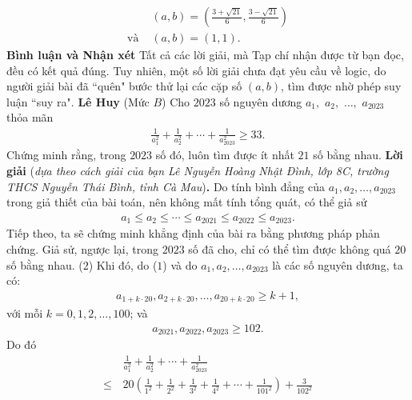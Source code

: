 \begin{multicols}{2}
\begin{align*}
		&\left( {a,b} \right) = \left( {\frac{{3 + \sqrt {21} }}{6},\frac{{3 - \sqrt {21} }}{6}} \right)\\
		\text{và }&\left( {a,b} \right) = \left( {1,1} \right).
	\end{align*}
	\textbf{\color{thachthuctoanhoc}Bình luận và Nhận xét}
	\vskip 0.05cm
	Tất cả các lời giải, mà Tạp chí nhận được từ bạn đọc, đều có kết quả đúng. Tuy nhiên, một số lời giải chưa đạt yêu cầu về logic, do người giải bài đã ``quên" bước thử lại các cặp số $(a, b)$, tìm được nhờ phép suy luận ``suy ra".
	\vskip 0.1cm
	\hfill	\textbf{\color{thachthuctoanhoc}Lê Huy}
	\vskip 0.1cm
	{}
	(Mức $B$) Cho $2023$ số nguyên dương $a_1,$ $a_2,$ $\ldots,$ $a_{2023}$ thỏa mãn
	\begin{align*}
		\frac{1}{a_1^2}+\frac{1}{a_2^2}+\cdots+\frac{1}{a_{2023}^2}\ge 33.
	\end{align*}
	Chứng minh rằng, trong $2023$ số đó, luôn tìm được ít nhất $21$ số bằng nhau. 
	\vskip 0.05cm
	\textbf{\color{thachthuctoanhoc}Lời giải} (\textit{dựa theo cách giải của bạn Lê Nguyễn Hoàng Nhật Đình, lớp 8C, trường THCS Nguyễn Thái Bình, tỉnh Cà Mau})\textbf{\color{thachthuctoanhoc}.}
	\vskip 0.05cm
	Do tính bình đẳng của ${a_1},{a_2}, \ldots ,{a_{2023}}$ trong giả thiết của bài toán, nên không mất tính tổng quát, có thể giả sử
	\begin{align*}
		{a_1} \!\le\! {a_2} \!\le\!  \cdots \! \le\! {a_{2021}} \!\le\! {a_{2022}} \!\le\! {a_{2023}}. \tag{$1$}
	\end{align*}
	Tiếp theo, ta sẽ chứng minh khẳng định của bài ra bằng phương pháp phản chứng.
	\vskip 0.05cm
	Giả sử, ngược lại, trong $2023$ số đã cho, chỉ có thể tìm được không quá $20$ số bằng \linebreak nhau.  \hfill ($2$)
	\vskip 0.05cm
	Khi đó, do ($1$) và do ${a_1},{a_2}, \ldots ,{a_{2023}}$  là các số nguyên dương, ta có:
	\begin{align*}
		{a_{1 + k \cdot 20}},{a_{2 + k \cdot 20}}, \ldots ,{a_{20 + k \cdot 20}} \ge k + 1,
	\end{align*}
	với mỗi $k = 0, 1, 2, \ldots, 100$; và 
	\begin{align*}
		{a_{2021}},{a_{2022}}, {a_{2023}} \ge 102.
	\end{align*}
	Do đó
	\begin{align*}
		&\frac{1}{{a_1^2}} + \frac{1}{{a_2^2}} +  \cdots  + \frac{1}{{a_{2023}^2}}\\
		\le\, &20\!\left(\!\! {\frac{1}{{{1^2}}} \!+\! \frac{1}{{{2^2}}} \!+\! \frac{1}{{{3^2}}} \!+\! \frac{1}{{{4^2}}} \!+\!  \cdots  \!+\! \frac{1}{{{{101}^2}}}} \!\!\right) \!\!+\!\! \frac{3}{{{{102}^2}}}\\

\end{align*}
\end{multicols}
